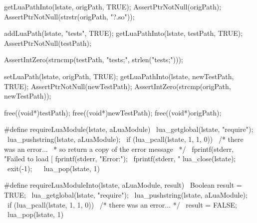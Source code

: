 
\startCTest
  getLuaPathInto(lstate, origPath, TRUE);
  AssertPtrNotNull(origPath);
  AssertPtrNotNull(strstr(origPath, "?.so"));

  addLuaPath(lstate, "tests", TRUE);
  getLuaPathInto(lstate, testPath, TRUE);
  AssertPtrNotNull(testPath);

  AssertIntZero(strncmp(testPath, "tests;", strlen("tests;")));
  
  setLuaPath(lstate, origPath, TRUE);
  getLuaPathInto(lstate, newTestPath, TRUE);
  AssertPtrNotNull(newTestPath);
  AssertIntZero(strcmp(origPath, newTestPath));
  
  free((void*)testPath);
  free((void*)newTestPath);
  free((void*)origPath);
\stopCTest
\stopTestCase
\stopTestSuite


\startCHeader
#define requireLuaModule(lstate, aLuaModule)              \
  lua_getglobal(lstate, "require");                       \
  lua_pushstring(lstate, aLuaModule);                     \
  if (lua_pcall(lstate, 1, 1, 0)) {                       \
    /* there was an error...                              \
     * so return a copy of the error message              \
     */                                                   \
    fprintf(stderr, "Failed to load [%
    fprintf(stderr, "Error:\n");                          \
    fprintf(stderr, "%
    lua_close(lstate);                                    \
    exit(-1);                                             \
  }                                                       \
  lua_pop(lstate, 1)
\stopCHeader

\startCHeader
#define requireLuaModuleInto(lstate, aLuaModule, result)  \
  Boolean result = TRUE;                                  \
  lua_getglobal(lstate, "require");                       \
  lua_pushstring(lstate, aLuaModule);                     \
  if (lua_pcall(lstate, 1, 1, 0)) {                       \
    /* there was an error... */                           \
    result = FALSE;                                       \
  }                                                       \
  lua_pop(lstate, 1)
\stopCHeader

\stopTestSuite

